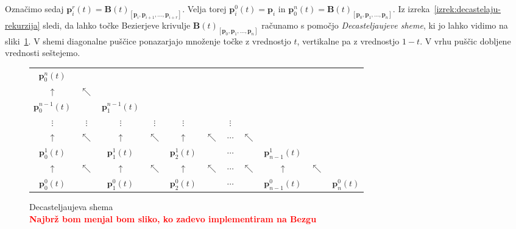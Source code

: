 \documentclass[isrm2, tisk]{fmfdelo}
\newcommand{\p}{\mathbf{p}}
\newcommand{\bigbbt}{\textbf{B}(t)}
\newcommand{\mycomment}[1]{\textbf{\textcolor{red}{#1}}}
\begin{document}
    Označimo sedaj $\p_{i}^r(t) = \bigbbt_{[\p_i,\p_{i+1},\dots,\p_{i+r}]}$.
    Velja torej $\p_{i}^0(t)=\p_i$ in  $\p_{0}^n(t)=\bigbbt_{[\p_0,\p_1,\dots,\p_n]}$.
    Iz izreka~\ref{izrek:decastelaju-rekurzija} sledi, da lahko točke Bezierjeve krivulje $\bigbbt_{[\p_0,\p_1,\dots,\p_n]}$ računamo s pomočjo \textit{Decasteljaujeve sheme}, ki jo lahko vidimo na sliki~\ref{fig:decasteljau-scheme}.
    V shemi diagonalne puščice ponazarjajo množenje točke z vrednostjo $t$, vertikalne pa z vrednostjo $1-t$.
    V vrhu puščic dobljene vrednosti seštejemo.
    \begin{figure}[H]
        \label{fig:decasteljau-scheme}
        \begin{tabular}{ c c c c c c c c c c c}
            $\p_{0}^n(t)$     &            &                   &            &               &            &          &            &                 &            &               \\
            $\uparrow$        & $\nwarrow$ &                   &            &               &            &          &            &                 &            &               \\
            $\p_{0}^{n-1}(t)$ &            & $\p_{1}^{n-1}(t)$ &            &               &            &          &            &                 &            &               \\
            $\vdots$          & $\vdots$   & $\vdots$          & $\vdots$   & $\vdots$      &            & $\vdots$ &            &                 &            &               \\
            $\uparrow$        & $\nwarrow$ & $\uparrow$        & $\nwarrow$ & $\uparrow$    & $\nwarrow$ & $\cdots$ & $\nwarrow$ &                 &            &               \\
            $\p_{0}^1(t)$     &            & $\p_{1}^1(t)$     &            & $\p_{2}^1(t)$ &            & $\cdots$ &            & $\p_{n-1}^1(t)$ &            &               \\
            $\uparrow$        & $\nwarrow$ & $\uparrow$        & $\nwarrow$ & $\uparrow$    & $\nwarrow$ & $\cdots$ & $\nwarrow$ & $\uparrow$      & $\nwarrow$     &\\
            $\p_{0}^0(t)$     &            & $\p_{1}^0(t)$     &            & $\p_{2}^0(t)$ &            & $\cdots$ &            & $\p_{n-1}^0(t)$ &            & $\p_{n}^0(t)$
        \end{tabular}
        \caption{Decasteljaujeva shema \\ \mycomment{Najbrž bom menjal bom sliko, ko zadevo implementiram na Bezgu}}
    \end{figure}
\end{document}
